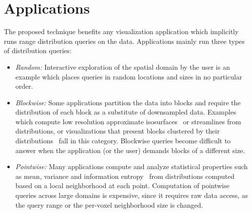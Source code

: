 \section{Applications}
\label{sec:application}
The proposed technique benefits any visualization application which implicitly runs range distribution queries on the data. Applications mainly run three types of distribution queries:
\begin{itemize}
\item \emph{Random:} Interactive exploration of the spatial domain by the user is an example which places queries in random locations and sizes in no particular order.
\item \emph{Blockwise:} Some applications partition the data into blocks and require the distribution of each block as a substitute of downsampled data. Examples which compute low resolution approximate isosurfaces~\cite{Hixel11} or streamlines from distributions, or visualizations that present blocks clustered by their distributions~\cite{transgraph11} fall in this category.  Blockwise queries become difficult to answer when the application (or the user) demands blocks of a different size.
\item \emph{Pointwise:} Many applications compute and analyze statistical properties such as mean, variance and information entropy~\cite{Xu10} from distributions computed based on a local neighborhood at each point. Computation of pointwise queries across large domains is expensive, since it requires raw data access, as the query range or the per-voxel neighborhood size is changed.
\end{itemize}

